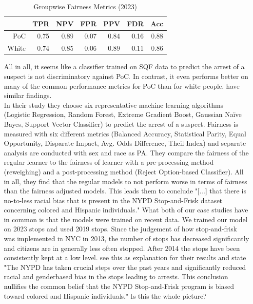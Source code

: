 \begin{table}[ht]
  \centering
  \begin{tabular}{|rrrrrrr|}
    \hline
   & TPR & NPV & FPR & PPV & FDR & Acc \\ 
    \hline
    PoC & 0.75 & 0.89 & 0.07 & 0.84 & 0.16 & 0.88 \\ 
    White & 0.74 & 0.85 & 0.06 & 0.89 & 0.11 & 0.86 \\ 
     \hline
  \end{tabular}
  \caption{Groupwise Fairness Metrics (2023)} 
  \label{tab:groupwise_metrics_2023}
\end{table}

All in all, it seems like a classifier trained on SQF data to predict the arrest of a suspect is not discriminatory against PoC. In contrast, it even performs better on many of the common performance metrics for PoC than for white people. \cite{Badr2022DTFANSP} have similar findings.\\
In their study they choose six representative machine learning algorithms (Logistic Regression, Random Forest, Extreme Gradient Boost, Gaussian Naïve Bayes, Support Vector Classifier) to predict the arrest of a suspect. Fairness is measured with six different metrics (Balanced Accuracy, Statistical Parity, Equal Opportunity, Disparate Impact, Avg. Odds Difference, Theil Index) and separate analysis are conducted with sex and race as PA.
They compare the fairness of the regular learner to the fairness of learner with a pre-processing method (reweighing) and a post-processing method (Reject Option-based Classifier). All in all, they find that the regular models to not perform worse in terms of fairness than the fairness adjusted models. This leads them to conclude "[...] that there is no-to-less racial bias that is present in the NYPD Stop-and-Frisk dataset concerning colored and Hispanic individuals."
What both of our case studies have in common is that the models were trained on recent data. We trained our model on 2023 stops and \cite{Badr2022DTFANSP} used 2019 stops. Since the judgement of how stop-and-frisk was implemented in NYC in 2013, the number of stops has decreased significantly and citizens are in generally less often stopped. After 2014 the stops have been consistently kept at a low level. 
\cite{Badr2022DTFANSP} see this as explanation for their results and state "The NYPD has taken crucial steps over the past years and significantly reduced racial and genderbased bias in the stops leading to arrests. This conclusion nullifies the common belief that the NYPD Stop-and-Frisk program is biased toward colored and Hispanic individuals." Is this the whole picture?





